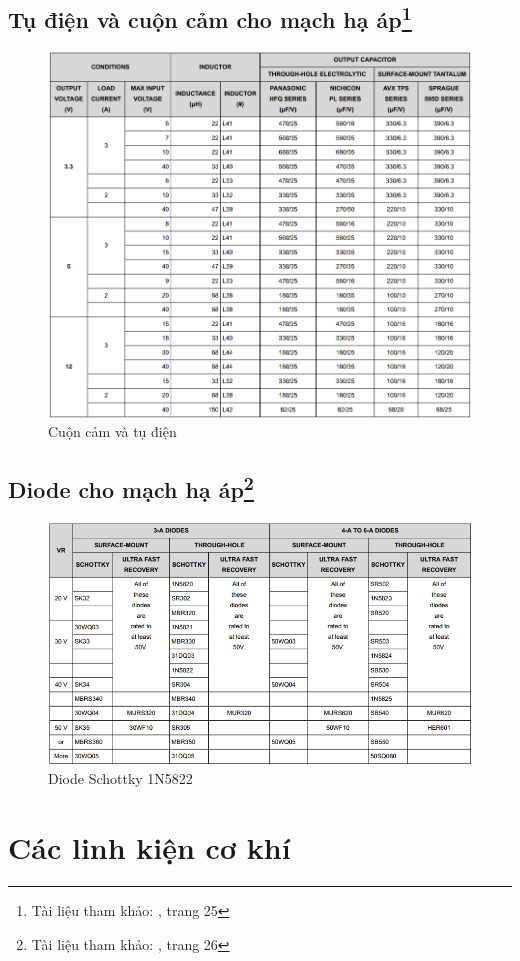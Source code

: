         \subsection[Tụ điện và cuộn cảm cho mạch hạ áp]{Tụ điện và cuộn cảm cho mạch hạ áp\footnote{Tài liệu tham khảo: \cite{lm2596}, trang 25}}
            \begin{figure}[H]
                \centering
                \includegraphics[width=1\textwidth]{pictures/appendix/app_p3_ChooseComponent.png}
                \caption{Cuộn cảm và tụ điện}
                \label{fig:InductorAndCapacitor}
            \end{figure}
        \subsection[Diode cho mạch hạ áp]{Diode cho mạch hạ áp\footnote{Tài liệu tham khảo: \cite{lm2596}, trang 26}}
            \begin{figure}[H]
                \centering
                \includegraphics[width=1\textwidth]{pictures/appendix/app_p4_DiodeChoose.png}
                \caption{Diode Schottky 1N5822}
                \label{fig:Diode}
            \end{figure}

    \section{Các linh kiện cơ khí}
        
